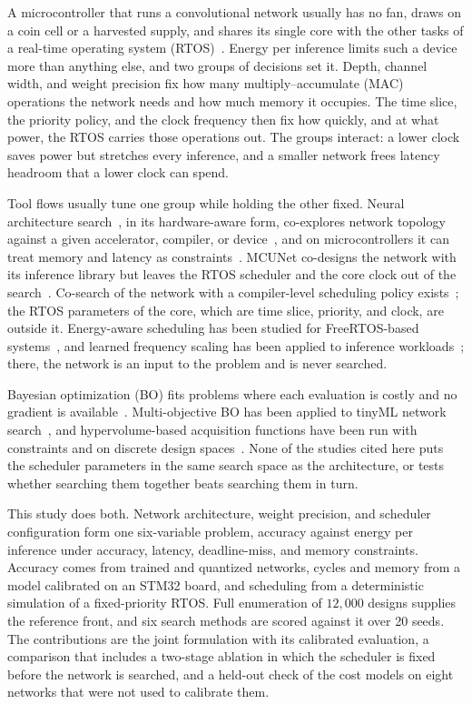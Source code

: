 
A microcontroller that runs a convolutional network usually has no fan,
draws on a coin cell or a harvested supply, and shares its single core
with the other tasks of a real-time operating system
(RTOS)~\cite{tsoukas2024tinyml,ray2022tinyml}. Energy per inference limits
such a device more than anything else, and two groups of decisions set it.
Depth, channel width, and weight precision fix how many
multiply--accumulate (MAC) operations the network needs and how much memory
it occupies. The time slice, the priority policy, and the clock frequency
then fix how quickly, and at what power, the RTOS carries those operations
out. The groups interact: a lower clock saves power but stretches every
inference, and a smaller network frees latency headroom that a lower clock
can spend.

Tool flows usually tune one group while holding the other fixed. Neural
architecture search~\cite{ren2022nas}, in its hardware-aware form,
co-explores network topology against a given accelerator, compiler, or
device~\cite{chitty2023hwnas,jiang2020coexploration}, and on
microcontrollers it can treat memory and latency as constraints~\cite{king2025mcu}.
MCUNet co-designs the network with its inference library but leaves the RTOS
scheduler and the core clock out of the search~\cite{lin2023tinyml}.
Co-search of the network with a compiler-level scheduling policy
exists~\cite{chen2023chanas}; the RTOS parameters of the core, which are
time slice, priority, and clock, are outside it. Energy-aware scheduling has
been studied for FreeRTOS-based systems~\cite{oliveira2023freertos}, and
learned frequency scaling has been applied to inference
workloads~\cite{zhang2024dvfo}; there, the network is an input to the problem
and is never searched.

Bayesian optimization (BO) fits problems where each evaluation is costly and
no gradient is available~\cite{wang2023bo}. Multi-objective BO has been
applied to tinyML network search~\cite{deutel2025mobo}, and hypervolume-based
acquisition functions have been run with constraints and on discrete design
spaces~\cite{low2024constrained,mamun2025mobo}. None of the studies cited here
puts the scheduler parameters in the same search space as the architecture,
or tests whether searching them together beats searching them in turn.

This study does both. Network architecture, weight precision, and scheduler
configuration form one six-variable problem, accuracy against energy per
inference under accuracy, latency, deadline-miss, and memory constraints.
Accuracy comes from trained and quantized networks, cycles and memory from a
model calibrated on an STM32 board, and scheduling from a deterministic
simulation of a fixed-priority RTOS. Full enumeration of $12{,}000$ designs
supplies the reference front, and six search methods are scored against it
over 20 seeds. The contributions are the joint formulation with its
calibrated evaluation, a comparison that includes a two-stage ablation in
which the scheduler is fixed before the network is searched, and a
held-out check of the cost models on eight networks that were not used to
calibrate them.
